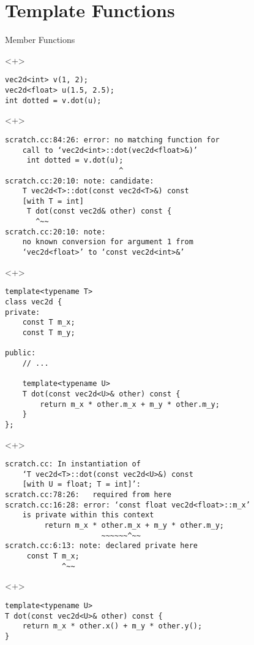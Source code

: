 \documentclass[table]{beamer}
\begin{document}
\section{Template Functions}

\begin{frame}[fragile]{Member Functions}
  \begin{onlyenv}<+>
    \begin{verbatim}
vec2d<int> v(1, 2);
vec2d<float> u(1.5, 2.5);
int dotted = v.dot(u);
    \end{verbatim}
  \end{onlyenv}

  \begin{onlyenv}<+>
    \begin{verbatim}
scratch.cc:84:26: error: no matching function for
    call to ‘vec2d<int>::dot(vec2d<float>&)’
     int dotted = v.dot(u);
                          ^
scratch.cc:20:10: note: candidate:
    T vec2d<T>::dot(const vec2d<T>&) const
    [with T = int]
     T dot(const vec2d& other) const {
       ^~~
scratch.cc:20:10: note:
    no known conversion for argument 1 from
    ‘vec2d<float>’ to ‘const vec2d<int>&’
    \end{verbatim}
  \end{onlyenv}

  \begin{onlyenv}<+>
    \begin{verbatim}
template<typename T>
class vec2d {
private:
    const T m_x;
    const T m_y;

public:
    // ...

    template<typename U>
    T dot(const vec2d<U>& other) const {
        return m_x * other.m_x + m_y * other.m_y;
    }
};
    \end{verbatim}
  \end{onlyenv}

  \begin{onlyenv}<+>
    \begin{verbatim}
scratch.cc: In instantiation of
    ‘T vec2d<T>::dot(const vec2d<U>&) const
    [with U = float; T = int]’:
scratch.cc:78:26:   required from here
scratch.cc:16:28: error: ‘const float vec2d<float>::m_x’
    is private within this context
         return m_x * other.m_x + m_y * other.m_y;
                      ~~~~~~^~~
scratch.cc:6:13: note: declared private here
     const T m_x;
             ^~~
    \end{verbatim}
  \end{onlyenv}

  \begin{onlyenv}<+>
    \begin{verbatim}
template<typename U>
T dot(const vec2d<U>& other) const {
    return m_x * other.x() + m_y * other.y();
}
    \end{verbatim}
  \end{onlyenv}
\end{frame}
\end{document}
